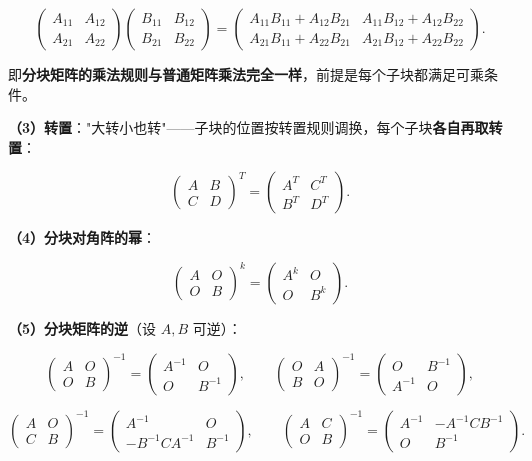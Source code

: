 \documentclass[11pt,openany,UTF8]{ctexbook}
\begin{document}
\[\begin{pmatrix}A_{11}&A_{12}\\A_{21}&A_{22}\end{pmatrix}\begin{pmatrix}B_{11}&B_{12}\\B_{21}&B_{22}\end{pmatrix}=\begin{pmatrix}A_{11}B_{11}+A_{12}B_{21}&A_{11}B_{12}+A_{12}B_{22}\\A_{21}B_{11}+A_{22}B_{21}&A_{21}B_{12}+A_{22}B_{22}\end{pmatrix}.\]

即\textbf{分块矩阵的乘法规则与普通矩阵乘法完全一样}，前提是每个子块都满足可乘条件。

\textbf{（3）转置}："大转小也转"——子块的位置按转置规则调换，每个子块\textbf{各自再取转置}：

\[\begin{pmatrix}A&B\\C&D\end{pmatrix}^T=\begin{pmatrix}A^T&C^T\\B^T&D^T\end{pmatrix}.\]

\textbf{（4）分块对角阵的幂}：

\[\begin{pmatrix}A&O\\O&B\end{pmatrix}^k=\begin{pmatrix}A^k&O\\O&B^k\end{pmatrix}.\]

\textbf{（5）分块矩阵的逆}（设 $A,B$ 可逆）：

\[\begin{pmatrix}A&O\\O&B\end{pmatrix}^{-1}=\begin{pmatrix}A^{-1}&O\\O&B^{-1}\end{pmatrix},\qquad \begin{pmatrix}O&A\\B&O\end{pmatrix}^{-1}=\begin{pmatrix}O&B^{-1}\\A^{-1}&O\end{pmatrix},\]

\[\begin{pmatrix}A&O\\C&B\end{pmatrix}^{-1}=\begin{pmatrix}A^{-1}&O\\-B^{-1}CA^{-1}&B^{-1}\end{pmatrix},\qquad \begin{pmatrix}A&C\\O&B\end{pmatrix}^{-1}=\begin{pmatrix}A^{-1}&-A^{-1}CB^{-1}\\O&B^{-1}\end{pmatrix}.\]
\end{document}
